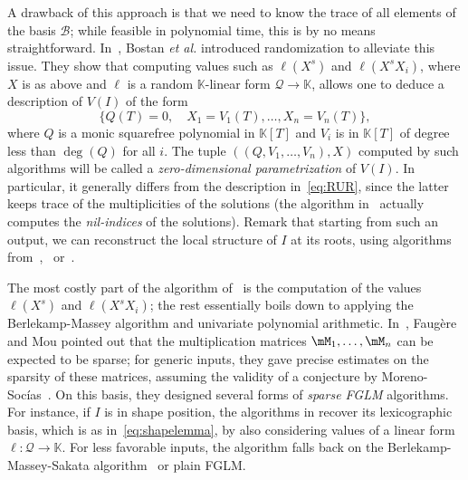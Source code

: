 \documentclass[12pt]{article}
\newcommand{\basis}{\mathscr{B}}
\newcommand{\lf}{X}
\newcommand{\residueI}{\mathscr{Q}}
\newcommand{\sqfree}{Q}
\def\K{\mathbb{K}}
\def\K {\ensuremath{\mathbb{K}}}
\begin{document}
A drawback of this approach is that we need to know the trace of all
elements of the basis $\basis$; while feasible in polynomial time,
this is by no means straightforward. In~\cite{BoSaSc03}, Bostan {\it
  et al.} introduced randomization to alleviate this issue. They show
that computing values such as $\ell(\lf^s)$ and $\ell(\lf^s X_i)$, where
$\lf$ is as above and 
$\ell$ is a random $\K$-linear form $\residueI \to \K$, allows one to deduce
a description of $V(I)$ of the form
\begin{equation}\label{eq:BoSaSc03}
 \{  \sqfree(T)=0, \quad X_1 = V_1(T), \dots,X_n = V_n(T) \},
\end{equation}
where $\sqfree$ is a monic squarefree polynomial in $\K[T]$ and $V_i$ is in
$\K[T]$ of degree less than $\deg(\sqfree)$ for all $i$. The tuple
 $((\sqfree,V_1,\dots,V_n),\lf)$ computed by  such algorithms
will be called a {\em zero-dimensional parametrization} of $V(I)$. In
particular, it generally differs from the description
in~\cref{eq:RUR}, since the latter keeps trace of the multiplicities
of the solutions (the algorithm in~\cite{BoSaSc03} actually computes
the {\em nil-indices} of the solutions). Remark that starting from
such an output, we can reconstruct the local structure of $I$ at 
its roots, using algorithms from~\cite{MaMoMo96},~\cite{Mourrain97} or~\cite{NeRaSc17}.

The most costly part of the algorithm of~\cite{BoSaSc03} is the
computation of the values $\ell(\lf^s)$ and $\ell(\lf^s X_i)$; the
rest essentially boils down to applying the Berlekamp-Massey algorithm
and univariate polynomial arithmetic. In~\cite{FaMo17}, Faug{\`e}re
and Mou pointed out that the multiplication matrices
$\mM_1,\dots,\mM_n$ can be expected to be sparse; for generic inputs,
they gave precise estimates on the sparsity of these matrices,
assuming the validity of a conjecture by
Moreno-Soc\'ias~\cite{MorenoSocias91}.  On this basis, they designed
several forms of {\em sparse FGLM} algorithms. For instance, if $I$ is
in shape position, the algorithms in \cite{FaMo17} recover its
lexicographic basis, which is as in~\eqref{eq:shapelemma}, by also
considering values of a linear form $\ell:\residueI \to \K$. For less
favorable inputs, the algorithm falls back on the
Berlekamp-Massey-Sakata algorithm~\cite{Sakata90} or plain FGLM.
\end{document}
